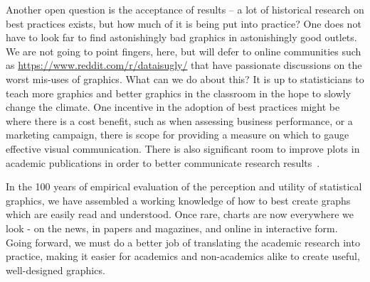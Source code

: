 \documentclass[letterpaper]{ar-1col}\usepackage[]{graphicx}\usepackage[]{color}
\begin{document}
Another open question is the acceptance of results -- a lot of historical research on best practices exists, but how much of it is being put into practice? One does not have to look far to find astonishingly bad graphics in astonishingly good outlets. We are not going to point fingers, here, but will defer to online communities such as \url{https://www.reddit.com/r/dataisugly/} that have passionate discussions on the worst mis-uses of graphics.
What can we do about this? It is up to statisticians to teach more graphics and better graphics in the classroom in the hope to slowly change the climate.
One incentive in the adoption of best practices might be where there is a cost benefit, such as when assessing business performance, or a marketing campaign, there is scope for providing a measure on which to gauge effective visual communication. There is also significant room to improve plots in academic publications in order to better communicate research results~\citep{antony-inpress}.

In the 100 years of empirical evaluation of the perception and utility of statistical graphics, we have assembled a working knowledge of how to best create graphs which are easily read and understood. Once rare, charts are now everywhere we look - on the news, in papers and magazines, and online in interactive form. Going forward, we must do a better job of translating the academic research into practice, making it easier for academics and non-academics alike to create useful, well-designed graphics.
\end{document}
